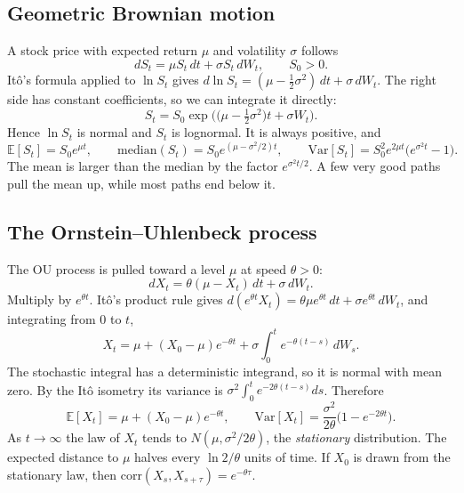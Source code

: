 \documentclass[11pt]{article}
\newcommand{\E}{\mathbb{E}}
\newcommand{\Var}{\mathrm{Var}}
\begin{document}
\subsection{Geometric Brownian motion}

A stock price with expected return $\mu$ and volatility $\sigma$ follows
\begin{equation}
dS_t=\mu S_t\,dt+\sigma S_t\,dW_t, \qquad S_0>0.
\label{eq:gbm}
\end{equation}
It\^o's formula applied to $\ln S_t$ gives $d\ln S_t=(\mu-\tfrac12\sigma^2)\,dt+\sigma\,dW_t$.
The right side has constant coefficients, so we can integrate it directly:
\begin{equation}
S_t=S_0\exp\!\Big(\big(\mu-\tfrac12\sigma^2\big)t+\sigma W_t\Big).
\label{eq:gbmsol}
\end{equation}
Hence $\ln S_t$ is normal and $S_t$ is lognormal. It is always positive, and
\begin{equation}
\E[S_t]=S_0e^{\mu t},\qquad
\mathrm{median}(S_t)=S_0e^{(\mu-\sigma^2/2)t},\qquad
\Var[S_t]=S_0^2e^{2\mu t}\big(e^{\sigma^2t}-1\big).
\end{equation}
The mean is larger than the median by the factor $e^{\sigma^2t/2}$. A few very good paths pull
the mean up, while most paths end below it.

\subsection{The Ornstein--Uhlenbeck process}

The OU process is pulled toward a level $\mu$ at speed $\theta>0$:
\begin{equation}
dX_t=\theta(\mu-X_t)\,dt+\sigma\,dW_t.
\label{eq:ou}
\end{equation}
Multiply by $e^{\theta t}$. It\^o's product rule gives
$d(e^{\theta t}X_t)=\theta\mu e^{\theta t}\,dt+\sigma e^{\theta t}\,dW_t$, and integrating
from $0$ to $t$,
\begin{equation}
X_t=\mu+(X_0-\mu)e^{-\theta t}+\sigma\int_0^t e^{-\theta(t-s)}\,dW_s.
\label{eq:ousol}
\end{equation}
The stochastic integral has a deterministic integrand, so it is normal with mean zero. By the
It\^o isometry its variance is $\sigma^2\!\int_0^t e^{-2\theta(t-s)}ds$. Therefore
\begin{equation}
\E[X_t]=\mu+(X_0-\mu)e^{-\theta t},\qquad
\Var[X_t]=\frac{\sigma^2}{2\theta}\big(1-e^{-2\theta t}\big).
\label{eq:oumom}
\end{equation}
As $t\to\infty$ the law of $X_t$ tends to $N(\mu,\sigma^2/2\theta)$, the \emph{stationary}
distribution. The expected distance to $\mu$ halves every $\ln2/\theta$ units of time. If $X_0$ is drawn
from the stationary law, then $\mathrm{corr}(X_s,X_{s+\tau})=e^{-\theta\tau}$.
\end{document}
